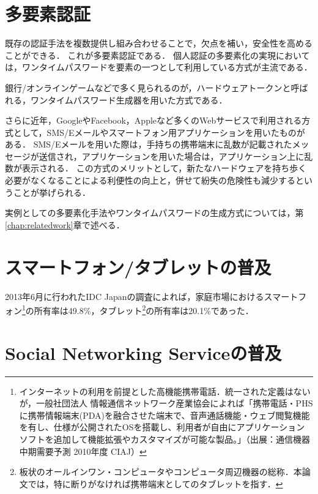 \section{多要素認証}
既存の認証手法を複数提供し組み合わせることで，欠点を補い，安全性を高めることができる．
これが多要素認証である．
個人認証の多要素化の実現においては，ワンタイムパスワードを要素の一つとして利用している方式が主流である．\cite{arXiv:1309.5344}

銀行/オンラインゲームなどで多く見られるのが，ハードウェアトークンと呼ばれる，ワンタイムパスワード生成器を用いた方式である．

さらに近年，GoogleやFacebook，Appleなど多くのWebサービスで利用される方式として，SMS/Eメールやスマートフォン用アプリケーションを用いたものがある．
SMS/Eメールを用いた際は，手持ちの携帯端末に乱数が記載されたメッセージが送信され，アプリケーションを用いた場合は，アプリケーション上に乱数が表示される．
この方式のメリットとして，新たなハードウェアを持ち歩く必要がなくなることによる利便性の向上と，併せて紛失の危険性も減少するということが挙げられる．

実例としての多要素化手法やワンタイムパスワードの生成方式については，第\ref{chap:relatedwork}章で述べる．

\section{スマートフォン/タブレットの普及}
2013年6月に行われたIDC Japanの調査\cite{idcsmartphone}によれば，家庭市場におけるスマートフォン\footnote{インターネットの利用を前提とした高機能携帯電話．統一された定義はないが，一般社団法人 情報通信ネットワーク産業協会によれば「携帯電話・PHSに携帯情報端末(PDA)を融合させた端末で、音声通話機能・ウェブ閲覧機能を有し、仕様が公開されたOSを搭載し、利用者が自由にアプリケーションソフトを追加して機能拡張やカスタマイズが可能な製品。」（出展：通信機器中期需要予測 2010年度 CIAJ）}の所有率は49.8\%，タブレット\footnote{板状のオールインワン・コンピュータやコンピュータ周辺機器の総称．本論文では，特に断りがなければ携帯端末としてのタブレットを指す．}の所有率は20.1\%であった．

\section{Social Networking Serviceの普及}

\newpage
